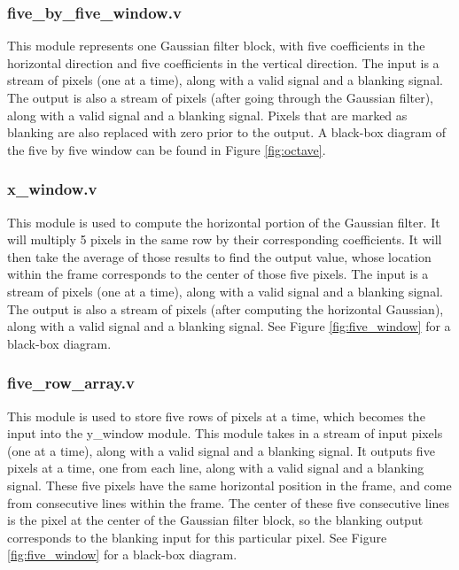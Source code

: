 \subsubsection{five\_by\_five\_window.v}

This module represents one Gaussian filter block, with five coefficients in the 
horizontal direction and five coefficients in the vertical direction. The input 
is a stream of pixels (one at a time), along with a valid signal and a blanking 
signal. The output is also a stream of pixels (after going through the Gaussian 
filter), along with a valid signal and a blanking signal. Pixels that are 
marked as blanking are also replaced with zero prior to the output. A black-box
diagram of the five by five window can be found in Figure \ref{fig:octave}.

\subsubsection{x\_window.v}

This module is used to compute the horizontal portion of the Gaussian filter. 
It will multiply 5 pixels in the same row by their corresponding coefficients. 
It will then take the average of those results to find the output value, whose 
location within the frame corresponds to the center of those five pixels. The 
input is a stream of pixels (one at a time), along with a valid signal and a 
blanking signal. The output is also a stream of pixels (after computing the 
horizontal Gaussian), along with a valid signal and a blanking signal. See Figure \ref{fig:five_window} for a 
black-box diagram.

\subsubsection{five\_row\_array.v}

This module is used to store five rows of pixels at a time, which becomes the 
input into the y\_window module. This module takes in a stream of input pixels 
(one at a time), along with a valid signal and a blanking signal. It outputs 
five pixels at a time, one from each line, along with a valid signal and a 
blanking signal. These five pixels have the same horizontal position in the 
frame, and come from consecutive lines within the frame. The center of these 
five consecutive lines is the pixel at the center of the Gaussian filter block, 
so the blanking output corresponds to the blanking input for this particular 
pixel. See Figure \ref{fig:five_window} for a 
black-box diagram.


